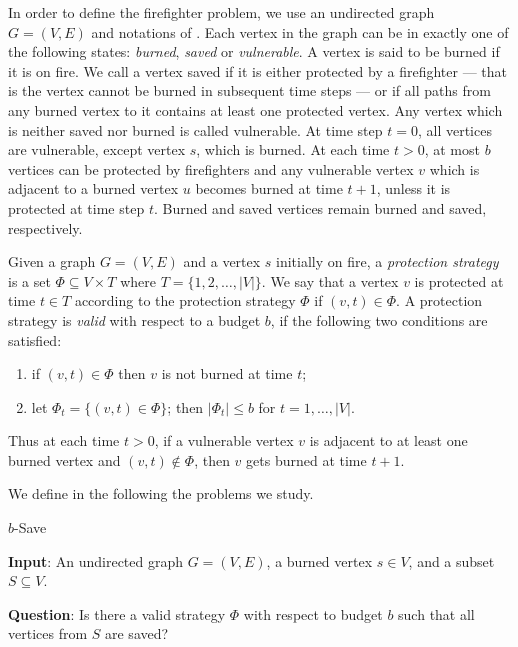 \documentclass[10pt]{article}
\begin{document}
\medskip

In order to define the firefighter problem, we use an undirected graph
$G=(V,E)$ and notations of \cite{anshelevich2009}. Each
 vertex in the graph can be in exactly one of the following states:
\textit{burned}, \textit{saved} or \textit{vulnerable}. 
A vertex is said to be burned if it is on fire.
We call a vertex saved if it is either protected by a firefighter --- that is the vertex cannot be burned in subsequent time steps --- or if all paths from any burned vertex to it contains at least one protected vertex.
Any vertex which is neither saved nor burned is called vulnerable.
At time step $t = 0$, all vertices are vulnerable, except vertex $s$,
which is burned. At each time $t
> 0$, at most $b$ vertices can be protected by firefighters and any vulnerable vertex $v$ which is adjacent to a burned
vertex $u$ becomes burned at time $t +
1$, unless it is protected at time step $t$. Burned and saved vertices
remain burned and saved, respectively.

\medskip

Given a graph $G=(V,E)$ and a vertex $s$  initially on fire, a \textit{protection strategy} is a set $\Phi \subseteq V \times T$ where  $T = \{1,2,\ldots,|V|\}$. We say
that a vertex $v$ is protected at time $t \in T$ according to the
protection strategy $\Phi$ if $(v, t) \in \Phi$. A protection
strategy is \textit{valid} with respect to a budget $b$, if the
following two conditions are satisfied:

\begin{enumerate}
\item if $(v, t) \in \Phi$ then $v$ is not burned at time $t$;
\item let $\Phi_{t}=\{(v,t) \in \Phi\}$; then $|\Phi_{t}| \leq b$ for $t = 1,\ldots,|V|$.
\end{enumerate}





Thus at each time $t > 0$, if a vulnerable  vertex $v$ is adjacent to at least one burned vertex and $(v, t) \notin \Phi$, then $v$ gets burned at time $t + 1$.




\medskip
We define in the following the problems we study.

\medskip
\noindent
 {\sc $b$-Save}

\noindent\textbf{Input}: An undirected graph $G=(V,E)$, a burned vertex $s\in V$, and a subset $S \subseteq V$.

\noindent\textbf{Question}: Is there a valid strategy
$\Phi$ with respect to budget $b$ such that all vertices from $S$ are saved?
\end{document}
